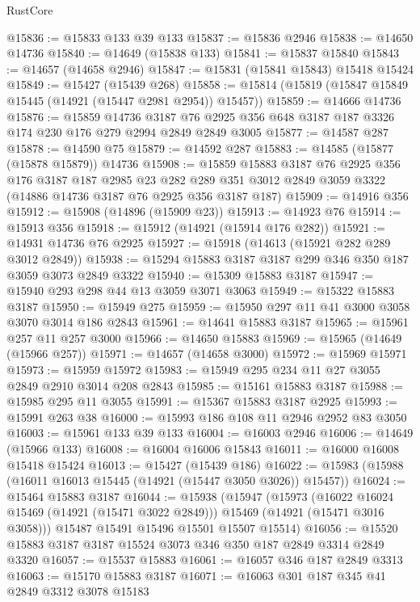 \begin{lexlean}{RustCore}
\begin{coremodule}
@15836 := @15833 @133 @39 @133
@15837 := @15836 @2946
@15838 := @14650 @14736
@15840 := @14649 (@15838 @133)
@15841 := @15837 @15840
@15843 := @14657 (@14658 @2946)
@15847 := @15831 (@15841 @15843) @15418 @15424
@15849 := @15427 (@15439 @268)
@15858 := @15814 (@15819 (@15847 @15849 @15445 (@14921 (@15447 @2981 @2954)) @15457))
@15859 := @14666 @14736
@15876 := @15859
    @14736
    @3187
    @76
    @2925
    @356
    @648
    @3187
    @187
    @3326
    @174
    @230
    @176
    @279
    @2994
    @2849
    @2849
    @3005
@15877 := @14587 @287
@15878 := @14590 @75
@15879 := @14592 @287
@15883 := @14585 (@15877 (@15878 @15879)) @14736
@15908 := @15859
    @15883
    @3187
    @76
    @2925
    @356
    @176
    @3187
    @187
    @2985
    @23
    @282
    @289
    @351
    @3012
    @2849
    @3059
    @3322
    (@14886 @14736 @3187 @76 @2925 @356 @3187 @187)
@15909 := @14916 @356
@15912 := @15908 (@14896 (@15909 @23))
@15913 := @14923 @76
@15914 := @15913 @356
@15918 := @15912 (@14921 (@15914 @176 @282))
@15921 := @14931 @14736 @76 @2925
@15927 := @15918 (@14613 (@15921 @282 @289 @3012 @2849))
@15938 := @15294 @15883 @3187 @3187 @299 @346 @350 @187 @3059 @3073 @2849 @3322
@15940 := @15309 @15883 @3187
@15947 := @15940 @293 @298 @44 @13 @3059 @3071 @3063
@15949 := @15322 @15883 @3187
@15950 := @15949 @275
@15959 := @15950 @297 @11 @41 @3000 @3058 @3070 @3014 @186 @2843
@15961 := @14641 @15883 @3187
@15965 := @15961 @257 @11 @257 @3000
@15966 := @14650 @15883
@15969 := @15965 (@14649 (@15966 @257))
@15971 := @14657 (@14658 @3000)
@15972 := @15969 @15971
@15973 := @15959 @15972
@15983 := @15949 @295 @234 @11 @27 @3055 @2849 @2910 @3014 @208 @2843
@15985 := @15161 @15883 @3187
@15988 := @15985 @295 @11 @3055
@15991 := @15367 @15883 @3187 @2925
@15993 := @15991 @263 @38
@16000 := @15993 @186 @108 @11 @2946 @2952 @83 @3050
@16003 := @15961 @133 @39 @133
@16004 := @16003 @2946
@16006 := @14649 (@15966 @133)
@16008 := @16004 @16006 @15843
@16011 := @16000 @16008 @15418 @15424
@16013 := @15427 (@15439 @186)
@16022 := @15983 (@15988 (@16011 @16013 @15445 (@14921 (@15447 @3050 @3026)) @15457))
@16024 := @15464 @15883 @3187
@16044 := @15938
    (@15947
      (@15973
        (@16022 @16024 @15469 (@14921 (@15471 @3022 @2849)))
        @15469
        (@14921 (@15471 @3016 @3058)))
      @15487
      @15491
      @15496
      @15501
      @15507
      @15514)
@16056 := @15520 @15883 @3187 @3187 @15524 @3073 @346 @350 @187 @2849 @3314 @2849 @3320
@16057 := @15537 @15883
@16061 := @16057 @346 @187 @2849 @3313
@16063 := @15170 @15883 @3187
@16071 := @16063 @301 @187 @345 @41 @2849 @3312 @3078 @15183

\end{coremodule}
\end{lexlean}
